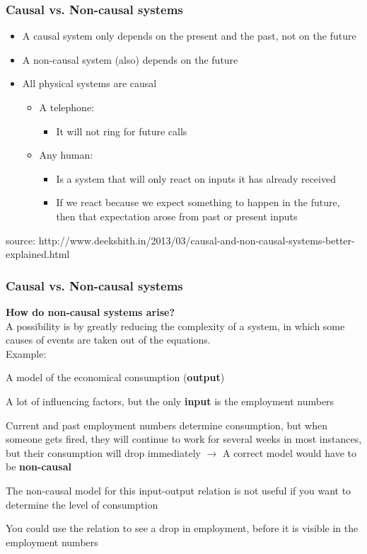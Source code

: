 \begin{frame}
	\frametitle{Causal vs. Non-causal systems}
	\begin{itemize}
		\item \normalsize{A causal system only depends on the present and the past, not on the future}
		\item \normalsize{A non-causal system (also) depends on the future}
		\item \normalsize{All physical systems are causal}
		\begin{itemize}
			\item \normalsize{A telephone:}
			\begin{itemize}
				\item \normalsize{It will not ring for future calls}
			\end{itemize}
			\item \normalsize{Any human:} 
			\begin{itemize}
				\item \normalsize{Is a system that will only react on inputs it has already received}
				\item \normalsize{If we react because we expect something to happen in the future, then that expectation arose from past or present inputs}
			\end{itemize}
		\end{itemize}
	\end{itemize}
	\bigskip
	\footnotesize{source: http://www.deekshith.in/2013/03/causal-and-non-causal-systems-better-explained.html}
\end{frame}

\begin{frame}
	\frametitle{Causal vs. Non-causal systems}
	\textbf{How do non-causal systems arise?}\\
	\medskip
	A possibility is by greatly reducing the complexity of a system, in which some causes of events are taken out of the equations.\\
	Example:\\
	\begin{itemize}
		\small{
			\item A model of the economical consumption (\textbf{output})
			\item A lot of influencing factors, but the only \textbf{input} is the employment numbers
			\item Current and past employment numbers determine consumption, but when someone gets fired, they will continue to work for several weeks in most instances, but their consumption will drop immediately
			$\rightarrow$ A correct model would have to be \textbf{non-causal}
			\item The non-causal model for this input-output relation is not useful if you want to determine the level of consumption
			\item You could use the relation to see a drop in employment, before it is visible in the employment numbers}
	\end{itemize}
\end{frame}

